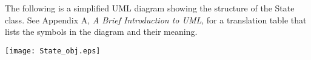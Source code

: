 

The following is a simplified UML diagram showing the structure of the
State class.  See Appendix A, {\it A Brief Introduction to UML},
for a translation table that lists the symbols in the diagram and their 
meaning.

\begin{center}
\texttt{[image: State\_obj.eps]}   
\end{center}

